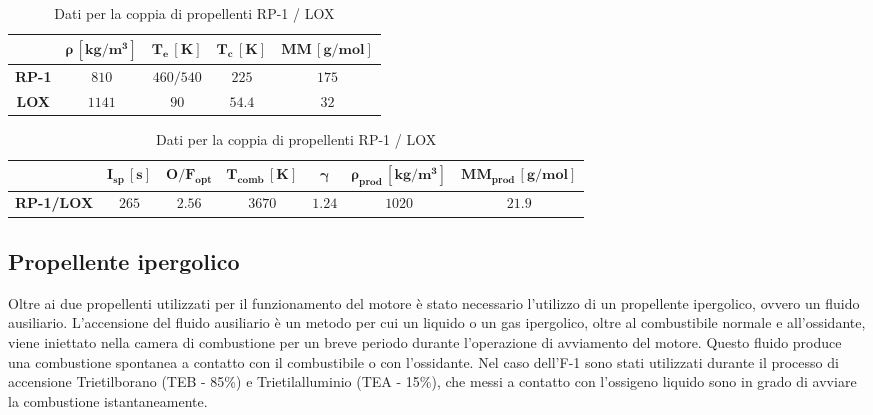\begin{table}[H]

\centering
\begin{tabular}{|c|c|c|c|c|}
\hline
& $\bm{\rho \, [kg/m^3]}$ & $\bm{T_{e} \, [K]}$ & $\bm{T_{c} \, [K]}$ & $\bm{MM \, [g/mol]}$ \\
\hline
\textbf{RP-1} & $810$ & $460 / 540$ & $225$ & $175$ \\
\hline
\textbf{LOX} & $1141$ & $90$ & $54.4$ & $32$ \\
\hline
\end{tabular}

\vspace{5pt}

\begin{tabular}{|c|c|c|c|c|c|c|}
\hline
& $\bm{I_{sp} \, [s]}$ & $\bm{O/F_{opt}}$ & $\bm{T_{comb} \, [K]}$ & $\bm{\gamma}$ & $\bm{\rho_{prod} \, [kg/m^3]}$ & $\bm{MM_{prod} \, [g/mol]}$ \\
\hline
\textbf{RP-1/LOX} & $265$ & $2.56$ & $3670$ & $1.24$ & $1020$ & $21.9$ \\
\hline
\end{tabular}

\caption{Dati per la coppia di propellenti RP-1 / LOX}
\label{table:dati_propellenti}

\end{table}

\subsection{Propellente ipergolico}
\label{subsec:propellente_ipergolico}

Oltre ai due propellenti utilizzati per il funzionamento del motore è stato necessario l’utilizzo di un propellente ipergolico, ovvero un fluido ausiliario.
L'accensione del fluido ausiliario è un metodo per cui un liquido o un gas ipergolico, oltre al combustibile normale e all'ossidante, viene iniettato nella camera di combustione per un breve periodo durante l'operazione di avviamento del motore. Questo fluido produce una combustione spontanea a contatto con il combustibile o con l'ossidante.
Nel caso dell’F-1 sono stati utilizzati durante il processo di accensione Trietilborano (TEB - 85\%) e Trietilalluminio (TEA - 15\%), che messi a contatto con l’ossigeno liquido sono in grado di avviare la combustione istantaneamente.